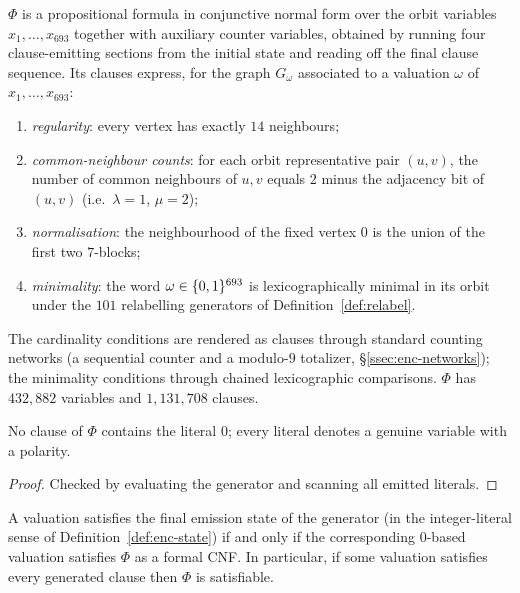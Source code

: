 \begin{definition}\label{def:phi}
$\Phi$ is a propositional formula in conjunctive normal form over the orbit
variables $x_1,\dots,x_{693}$ together with auxiliary counter variables,
obtained by running four clause-emitting sections from the initial state and
reading off the final clause sequence.  Its clauses express, for the graph
$G_\omega$ associated to a valuation $\omega$ of $x_1,\dots,x_{693}$:
\begin{enumerate}
\item \emph{regularity}: every vertex has exactly $14$ neighbours;
\item \emph{common-neighbour counts}: for each orbit representative pair
$(u,v)$, the number of common neighbours of $u,v$ equals $2$ minus the
adjacency bit of $(u,v)$ (i.e.\ $\lambda = 1$, $\mu = 2$);
\item \emph{normalisation}: the neighbourhood of the fixed vertex $0$ is the
union of the first two $7$-blocks;
\item \emph{minimality}: the word $\omega \in \{0,1\}^{693}$ is lexicographically
minimal in its orbit under the $101$ relabelling generators of
Definition~\ref{def:relabel}.
\end{enumerate}
The cardinality conditions are rendered as clauses through standard counting
networks (a sequential counter and a modulo-$9$ totalizer, \S\ref{ssec:enc-networks});
the minimality conditions through chained lexicographic comparisons.  $\Phi$
has $432{,}882$ variables and $1{,}131{,}708$ clauses.
\leanok
{}
\end{definition}

\begin{lemma}\label{lem:enc-nozero}
No clause of $\Phi$ contains the literal $0$; every literal denotes a genuine
variable with a polarity.
\leanok
{}
\end{lemma}

\begin{proof}\leanok
Checked by evaluating the generator and scanning all emitted literals.
\end{proof}

\begin{lemma}\label{lem:enc-cnfsat}
A valuation satisfies the final emission state of the generator (in the
integer-literal sense of Definition~\ref{def:enc-state}) if and only if the
corresponding $0$-based valuation satisfies $\Phi$ as a formal CNF.  In
particular, if some valuation satisfies every generated clause then $\Phi$ is
satisfiable.
\leanok
{}
\end{lemma}

